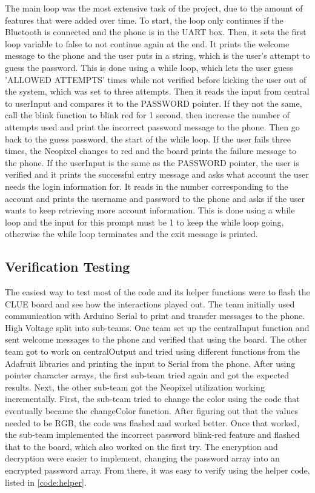 \documentclass[12pt]{article}
\begin{document}
\hspace{1cm}The main loop was the most extensive task of the project, due to the amount of features that were added over time. To start, the loop only continues if the Bluetooth is connected and the phone is in the UART box. Then, it sets the first loop variable to false to not continue again at the end. It prints the welcome message to the phone and the user puts in a string, which is the user's attempt to guess the password. This is done using a while loop, which lets the user guess 'ALLOWED ATTEMPTS' times while not verified before kicking the user out of the system, which was set to three attempts. Then it reads the input from central to userInput and compares it to the PASSWORD pointer. If they not the same, call the blink function to blink red for 1 second, then increase the number of attempts used and print the incorrect password message to the phone. Then go back to the guess password, the start of the while loop. If the user fails three times, the Neopixel changes to red and the board prints the failure message to the phone. If the userInput is the same as the PASSWORD pointer, the user is verified and it prints the successful entry message and asks what account the user needs the login information for. It reads in the number corresponding to the account and prints the username and password to the phone and asks if the user wants to keep retrieving more account information. This is done using a while loop and the input for this prompt must be 1 to keep the while loop going, otherwise the while loop terminates and the exit message is printed.


\subsection{Verification Testing}
\hspace{1cm} The easiest way to test most of the code and its helper functions were to flash the CLUE board and see how the interactions played out. The team initially used communication with Arduino Serial to print and transfer messages to the phone. High Voltage split into sub-teams. One team set up the centralInput function and sent welcome messages to the phone and verified that using the board. The other team got to work on centralOutput and tried using different functions from the Adafruit libraries and printing the input to Serial from the phone. After using pointer character arrays, the first sub-team tried again and got the expected results. Next, the other sub-team got the Neopixel utilization working incrementally. First, the sub-team tried to change the color using the code that eventually became the changeColor function. After figuring out that the values needed to be RGB, the code was flashed and worked better. Once that worked, the sub-team implemented the incorrect password blink-red feature and flashed that to the board, which also worked on the first try. The encryption and decryption were easier to implement, changing the password array into an encrypted password array. From there, it was easy to verify using the helper code, listed in \ref{code:helper}.
\end{document}
